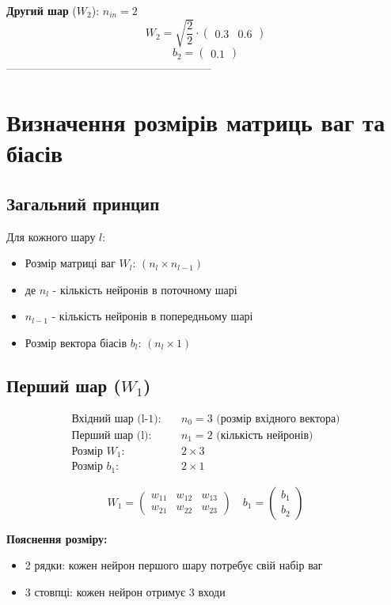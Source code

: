 \documentclass{article}
\begin{document}
\textbf{Другий шар} ($W_2$): $n_{in} = 2$
\[W_2 = \sqrt{\frac{2}{2}} \cdot \begin{pmatrix} 0.3 & 0.6 \end{pmatrix}\]
\[b_2 = \begin{pmatrix} 0.1 \end{pmatrix}\]
--------------------------------------------------------

\section{Визначення розмірів матриць ваг та біасів}

\subsection{Загальний принцип}
Для кожного шару $l$:
\begin{itemize}
    \item Розмір матриці ваг $W_l$: $(n_l \times n_{l-1})$
    \item де $n_l$ - кількість нейронів в поточному шарі
    \item $n_{l-1}$ - кількість нейронів в попередньому шарі
    \item Розмір вектора біасів $b_l$: $(n_l \times 1)$
\end{itemize}

\subsection{Перший шар ($W_1$)}
\begin{align*}
\text{Вхідний шар (l-1):} & \quad n_0 = 3 \text{ (розмір вхідного вектора)} \\
\text{Перший шар (l):} & \quad n_1 = 2 \text{ (кількість нейронів)} \\
\text{Розмір } W_1: & \quad 2 \times 3 \\
\text{Розмір } b_1: & \quad 2 \times 1
\end{align*}

\[W_1 = \begin{pmatrix} 
w_{11} & w_{12} & w_{13} \\
w_{21} & w_{22} & w_{23}
\end{pmatrix} \quad b_1 = \begin{pmatrix} b_1 \\ b_2 \end{pmatrix}\]

\textbf{Пояснення розміру:}
\begin{itemize}
    \item 2 рядки: кожен нейрон першого шару потребує свій набір ваг
    \item 3 стовпці: кожен нейрон отримує 3 входи
\end{itemize}
\end{document}
